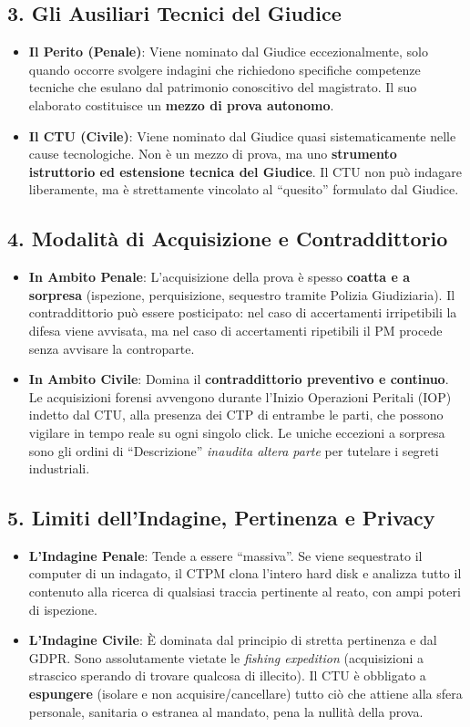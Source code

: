 \documentclass[11pt,a4paper]{article}
\begin{document}
\subsection{3. Gli Ausiliari Tecnici del Giudice}
\begin{itemize}
    \item \textbf{Il Perito (Penale)}: Viene nominato dal Giudice eccezionalmente, solo quando occorre svolgere indagini che richiedono specifiche competenze tecniche che esulano dal patrimonio conoscitivo del magistrato. Il suo elaborato costituisce un \textbf{mezzo di prova autonomo}.
    \item \textbf{Il CTU (Civile)}: Viene nominato dal Giudice quasi sistematicamente nelle cause tecnologiche. Non è un mezzo di prova, ma uno \textbf{strumento istruttorio ed estensione tecnica del Giudice}. Il CTU non può indagare liberamente, ma è strettamente vincolato al ``quesito'' formulato dal Giudice.
\end{itemize}

\subsection{4. Modalità di Acquisizione e Contraddittorio}
\begin{itemize}
    \item \textbf{In Ambito Penale}: L'acquisizione della prova è spesso \textbf{coatta e a sorpresa} (ispezione, perquisizione, sequestro tramite Polizia Giudiziaria). Il contraddittorio può essere posticipato: nel caso di accertamenti irripetibili la difesa viene avvisata, ma nel caso di accertamenti ripetibili il PM procede senza avvisare la controparte.
    \item \textbf{In Ambito Civile}: Domina il \textbf{contraddittorio preventivo e continuo}. Le acquisizioni forensi avvengono durante l'Inizio Operazioni Peritali (IOP) indetto dal CTU, alla presenza dei CTP di entrambe le parti, che possono vigilare in tempo reale su ogni singolo click. Le uniche eccezioni a sorpresa sono gli ordini di ``Descrizione'' \textit{inaudita altera parte} per tutelare i segreti industriali.
\end{itemize}

\subsection{5. Limiti dell'Indagine, Pertinenza e Privacy}
\begin{itemize}
    \item \textbf{L'Indagine Penale}: Tende a essere ``massiva''. Se viene sequestrato il computer di un indagato, il CTPM clona l'intero hard disk e analizza tutto il contenuto alla ricerca di qualsiasi traccia pertinente al reato, con ampi poteri di ispezione.
    \item \textbf{L'Indagine Civile}: È dominata dal principio di stretta pertinenza e dal GDPR. Sono assolutamente vietate le \textit{fishing expedition} (acquisizioni a strascico sperando di trovare qualcosa di illecito). Il CTU è obbligato a \textbf{espungere} (isolare e non acquisire/cancellare) tutto ciò che attiene alla sfera personale, sanitaria o estranea al mandato, pena la nullità della prova.
\end{itemize}
\end{document}
